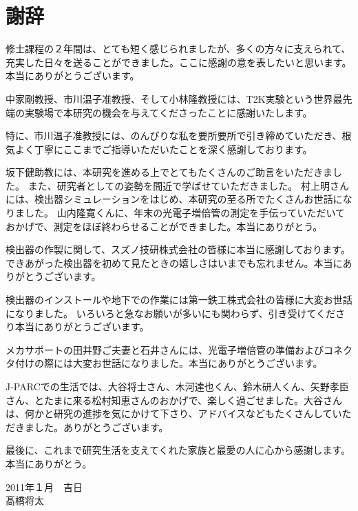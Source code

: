 \documentclass[11pt]{ltjsreport}
\begin{document}
\chapter*{謝辞}

修士課程の２年間は、とても短く感じられましたが、多くの方々に支えられて、充実した日々を送ることができました。ここに感謝の意を表したいと思います。本当にありがとうございます。

中家剛教授、市川温子准教授、そして小林隆教授には、T2K実験という世界最先端の実験場で本研究の機会を与えてくださったことに感謝いたします。

特に、市川温子准教授には、のんびりな私を要所要所で引き締めていただき、根気よく丁寧にここまでご指導いただいたことを深く感謝しております。

坂下健助教には、本研究を進める上でとてもたくさんのご助言をいただきました。
また、研究者としての姿勢を間近で学ばせていただきました。
村上明さんには、検出器シミュレーションをはじめ、本研究の至る所でたくさんお世話になりました。
山内隆寛くんに、年末の光電子増倍管の測定を手伝っていただいておかげで、測定をほぼ終わらせることができました。本当にありがとう。

検出器の作製に関して、スズノ技研株式会社の皆様に本当に感謝しております。できあがった検出器を初めて見たときの嬉しさはいまでも忘れません。本当にありがとうございます。

検出器のインストールや地下での作業には第一鉄工株式会社の皆様に大変お世話になりました。
いろいろと急なお願いが多いにも関わらず、引き受けてくださり本当にありがとうございます。

メカサポートの田井野ご夫妻と石井さんには、光電子増倍管の準備およびコネクタ付けの際には大変お世話になりました。本当にありがとうございます。


J-PARCでの生活では、大谷将士さん、木河達也くん、鈴木研人くん、矢野孝臣さん、とたまに来る松村知恵さんのおかげで、楽しく過ごせました。大谷さんは、何かと研究の進捗を気にかけて下さり、アドバイスなどもたくさんしていただきました。ありがとうございます。\newline

最後に、これまで研究生活を支えてくれた家族と最愛の人に心から感謝します。本当にありがとう。\newline
\begin{flushright}
2011年１月　吉日\\
髙橋将太
\end{flushright}




%
\end{document}
